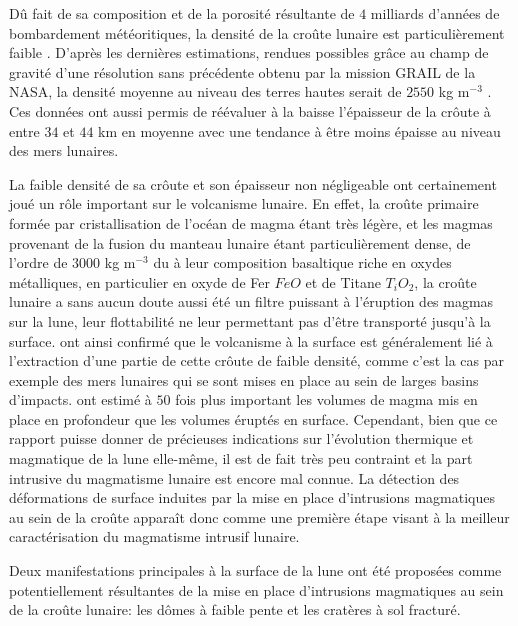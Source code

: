 Dû  fait  de sa  composition  et  de  la  porosité résultante  de  $4$
milliards  d'années de  bombardement météoritiques,  la densité  de la
croûte        lunaire        est        particulièrement        faible
\citep{Huang:2012gf,Han:2014ic}.   D'après les  dernières estimations,
rendues  possibles grâce  au champ  de gravité  d'une résolution  sans
précédente obtenu par la mission GRAIL  de la NASA, la densité moyenne
au   niveau  des   terres  hautes   serait  de   $2550$  kg   m$^{-3}$
\citep{Wieczorek:2013ipa}.  Ces données ont  aussi permis de réévaluer
à  la baisse  l'épaisseur de  la crôute  à entre  $34$ et  $44$ km  en
moyenne avec  une tendance  à être  moins épaisse  au niveau  des mers
lunaires.

La faible  densité de sa crôute  et son épaisseur non  négligeable ont
certainement joué  un rôle  important sur  le volcanisme  lunaire.  En
effet, la  croûte primaire  formée par  cristallisation de  l'océan de
magma  étant très  légère, et  les magmas  provenant de  la fusion  du
manteau lunaire étant particulièrement dense,  de l'ordre de $3000$ kg
m$^{-3}$ \citep{Kiefer:2012kp} du à  leur composition basaltique riche
en oxydes  métalliques, en  particulier en  oxyde de  Fer $FeO$  et de
Titane $T_iO_2$,  la croûte lunaire  a sans  aucun doute aussi  été un
filtre puissant à l'éruption des magmas sur la lune, leur flottabilité
ne    leur   permettant    pas    d'être    transporté   jusqu'à    la
surface. \citet{Wieczorek:2001jt} ont ainsi confirmé que le volcanisme
à la surface est généralement lié à l'extraction d'une partie de cette
crôute de  faible densité,  comme c'est  la cas  par exemple  des mers
lunaires  qui  se  sont  mises  en place  au  sein  de  larges  basins
d'impacts. \citet{Head:1992bk}  ont estimé à $50$  fois plus important
les  volumes de  magma  mis en  place en  profondeur  que les  volumes
éruptés en  surface. Cependant, bien  que ce rapport puisse  donner de
précieuses indications  sur l'évolution thermique et  magmatique de la
lune elle-même, il est de fait très peu contraint et la part intrusive
du  magmatisme  lunaire  est  encore mal  connue.   La  détection  des
déformations de  surface induites  par la  mise en  place d'intrusions
magmatiques  au sein  de la  croûte apparaît  donc comme  une première
étape  visant à  la  meilleur caractérisation  du magmatisme  intrusif
lunaire.

Deux  manifestations principales  à  la  surface de  la  lune ont  été
proposées  comme  potentiellement  résultantes  de la  mise  en  place
d'intrusions magmatiques  au sein  de la croûte  lunaire: les  dômes à
faible pente et les cratères à sol fracturé.

